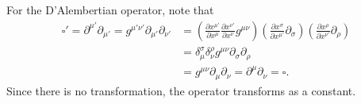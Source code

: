 \documentclass{../../templates/lkx_pset}
\begin{document}
\begin{parts}
	For the D'Alembertian operator, note that
	\[
		\begin{aligned}
			\square' = \partial^{\mu'}\partial_{\mu'} = g^{\mu'\nu'}\partial_{\mu'}\partial_{\nu'}
			 & = \left(\frac{\partial x^{\mu'}}{\partial x^\mu}\frac{\partial x^{\nu'}}{\partial x^\nu} g^{\mu\nu}\right)
			\left(\frac{\partial x^\sigma}{\partial x^{\mu'}}\partial_{\sigma} \right)
			\left(\frac{\partial x^\rho}{\partial x^{\nu'}}\partial_{\rho} \right)                                        \\
			 & = \delta^\sigma_\mu\delta^\rho_\nu g^{\mu\nu}\partial_\sigma\partial_\rho                                  \\
			 & = g^{\mu\nu}\partial_\mu\partial_\nu = \partial^\mu\partial_\nu = \square.
		\end{aligned}
	\]
	Since there is no transformation, the operator transforms as a constant.
\end{parts}
\end{document}
